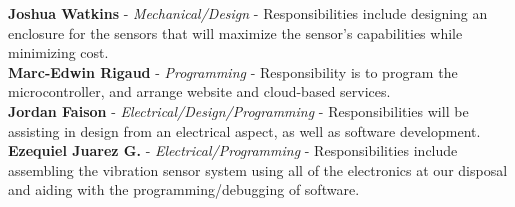 \documentclass[12pt]{article}
\begin{document}
\noindent \textbf{Joshua Watkins} - \textit{Mechanical/Design} - Responsibilities include designing an enclosure for the sensors that will maximize the sensor's capabilities while minimizing cost.\\

\noindent \textbf{Marc-Edwin Rigaud} - \textit{Programming} - Responsibility is to program the microcontroller, and arrange website and cloud-based services.\\

\noindent \textbf{Jordan Faison} - \textit{Electrical/Design/Programming} - Responsibilities will be assisting in design from an electrical aspect, as well as software development.\\

\noindent \textbf{Ezequiel Juarez G.} - \textit{Electrical/Programming} - Responsibilities include assembling the vibration sensor system using all of the electronics at our disposal and aiding with the programming/debugging of software.
\end{document}
